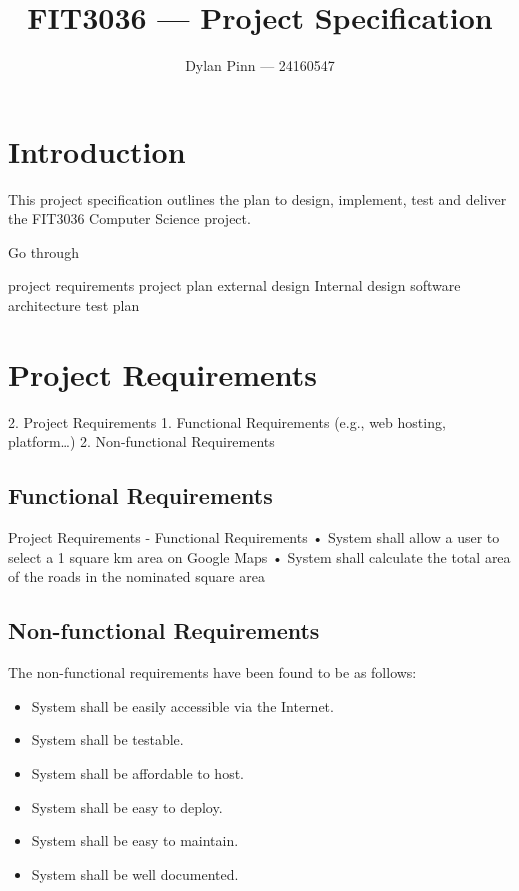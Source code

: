 \documentclass[a4paper,11pt]{article}
\begin{document}
\title{FIT3036 --- Project Specification}
\author{Dylan Pinn --- 24160547}
\maketitle
\pagebreak

\tableofcontents
\pagebreak

\section{Introduction}


This project specification outlines the plan to design, implement, test and
deliver the FIT3036 Computer Science project.

Go through

project requirements
project plan
external design
Internal design
software architecture
test plan

\section{Project Requirements}


2. Project Requirements
  1. Functional Requirements (e.g., web hosting, platform…)
  2. Non-functional Requirements

\subsection{Functional Requirements}


Project Requirements - Functional Requirements
• System shall allow a user to select a 1 square km area on Google Maps
• System shall calculate the total area of the roads in the nominated square area

\subsection{Non-functional Requirements}

The non-functional requirements have been found to be as follows:

\begin{itemize}
  \item System shall be easily accessible via the Internet.
  \item System shall be testable.
  \item System shall be affordable to host.
  \item System shall be easy to deploy.
  \item System shall be easy to maintain.
  \item System shall be well documented.
\end{itemize}
\end{document}
